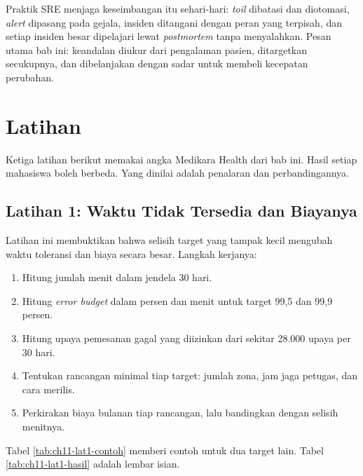 Praktik SRE menjaga keseimbangan itu sehari-hari: \textit{toil} dibatasi dan diotomasi, \textit{alert}
dipasang pada gejala, insiden ditangani dengan peran yang terpisah, dan setiap insiden besar
dipelajari lewat \textit{postmortem} tanpa menyalahkan. Pesan utama bab ini: keandalan diukur dari
pengalaman pasien, ditargetkan secukupnya, dan dibelanjakan dengan sadar untuk membeli kecepatan
perubahan.

\section{Latihan}

Ketiga latihan berikut memakai angka Medikara Health dari bab ini. Hasil setiap mahasiswa boleh
berbeda. Yang dinilai adalah penalaran dan perbandingannya.

\subsection*{Latihan 1: Waktu Tidak Tersedia dan Biayanya}

Latihan ini membuktikan bahwa selisih target yang tampak kecil mengubah waktu toleransi dan biaya
secara besar. Langkah kerjanya:
\begin{enumerate}
  \item Hitung jumlah menit dalam jendela 30 hari.
  \item Hitung \textit{error budget} dalam persen dan menit untuk target 99,5 dan 99,9 persen.
  \item Hitung upaya pemesanan gagal yang diizinkan dari sekitar 28.000 upaya per 30 hari.
  \item Tentukan rancangan minimal tiap target: jumlah zona, jam jaga petugas, dan cara merilis.
  \item Perkirakan biaya bulanan tiap rancangan, lalu bandingkan dengan selisih menitnya.
\end{enumerate}

Tabel \ref{tab:ch11-lat1-contoh} memberi contoh untuk dua target lain. Tabel
\ref{tab:ch11-lat1-hasil} adalah lembar isian.

